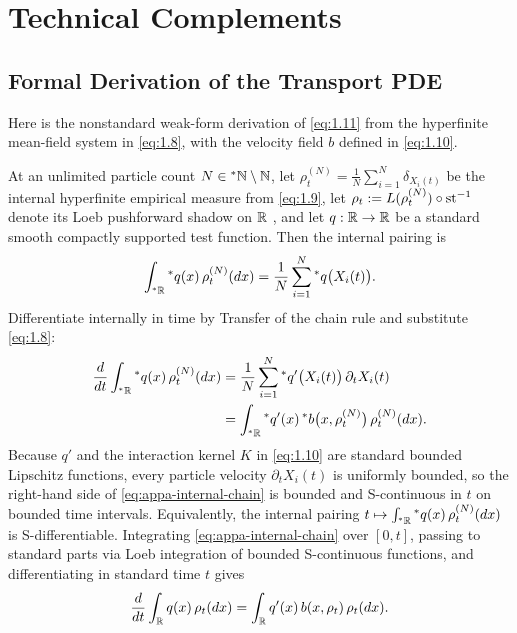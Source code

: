 \chapter{Technical Complements}
\label{app:technical}

\section{Formal Derivation of the Transport PDE}
\label{sec:appa-transport}

Here is the nonstandard weak-form derivation of \eqref{eq:1.11} from the hyperfinite mean-field system in \eqref{eq:1.8}, with the velocity field $b$ defined in \eqref{eq:1.10}.

At an unlimited particle count $N \in {}^*\mathbb{N} \setminus \mathbb{N}$, let $\rho_t^{(N)} = \frac{1}{N}\sum_{i=1}^N \delta_{X_i(t)}$ be the internal hyperfinite empirical measure from \eqref{eq:1.9},
let $\rho_t := L(\rho_t^{(N)}) \circ \operatorname{st}^{-1}$ denote its Loeb pushforward shadow on $\mathbb{R}$ \cite{loeb1975conversion,cutland2000loeb}, and let $q : \mathbb{R} \to \mathbb{R}$ be a standard smooth compactly supported test function. Then the internal pairing is
\begin{equation}
\label{eq:appa-emp-pairing}
\int_{{}^*\mathbb{R}} {}^*q(x)\,\rho_t^{(N)}(dx) = \frac{1}{N}\sum_{i=1}^N {}^*q\bigl(X_i(t)\bigr).
\end{equation}
Differentiate internally in time by Transfer of the chain rule and substitute \eqref{eq:1.8}:
\begin{equation}
\label{eq:appa-internal-chain}
\begin{aligned}
\frac{d}{dt}\int_{{}^*\mathbb{R}} {}^*q(x)\,\rho_t^{(N)}(dx)
&= \frac{1}{N}\sum_{i=1}^N {}^*q'\bigl(X_i(t)\bigr)\,\partial_t X_i(t) \\
&= \int_{{}^*\mathbb{R}} {}^*q'(x)\,{}^*b\bigl(x, \rho_t^{(N)}\bigr)\,\rho_t^{(N)}(dx).
\end{aligned}
\end{equation}
Because $q'$ and the interaction kernel $K$ in \eqref{eq:1.10} are standard bounded Lipschitz functions, every particle velocity $\partial_t X_i(t)$ is uniformly bounded, so the right-hand side of \eqref{eq:appa-internal-chain} is bounded and S-continuous in $t$ on bounded time intervals. Equivalently, the internal pairing $t \mapsto \int_{{}^*\mathbb{R}} {}^*q(x)\,\rho_t^{(N)}(dx)$ is S-differentiable. Integrating \eqref{eq:appa-internal-chain} over $[0, t]$, passing to standard parts via Loeb integration of bounded S-continuous functions, and differentiating in standard time $t$ gives
\begin{equation}
\label{eq:appa-weak-transport}
\frac{d}{dt}\int_{\mathbb{R}} q(x)\,\rho_t(dx) = \int_{\mathbb{R}} q'(x)\,b(x, \rho_t)\,\rho_t(dx).
\end{equation}
